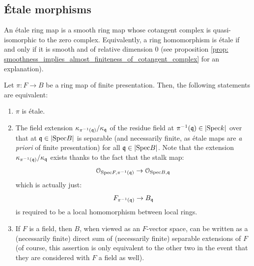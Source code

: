             \subsection{\'Etale morphisms} \label{subsection: etale_morphisms}
            \begin{definition} \label{def: etale_morphisms} 
                An \'etale ring map is a smooth ring map whose cotangent complex is quasi-isomorphic to the zero complex. Equivalently, a ring homomorphism is \'etale if and only if it is smooth and of relative dimension $0$ (see proposition \ref{prop: smoothness_implies_almost_finiteness_of_cotangent_complex} for an explanation). 
            \end{definition}
            
            \begin{proposition} \label{prop: separable_criterion_for_etaleness} 
                Let $\pi: F \to B$ be a ring map of finite presentation. Then, the following statements are equivalent:
                    \begin{enumerate}
                        \item $\pi$ is \'etale.
                        \item The field extension $\kappa_{\pi^{-1}(\mathfrak{q})}/\kappa_{\mathfrak{q}}$ of the residue field at $\pi^{-1}(\mathfrak{q}) \in |\mathrm{Spec} k|$ over that at $\mathfrak{q} \in |\mathrm{Spec} B|$ is separable (and necessarily finite, as \'etale maps are \textit{a priori} of finite presentation) for all $\mathfrak{q} \in |\mathrm{Spec} B|$. Note that the extension $\kappa_{\pi^{-1}(\mathfrak{q})}/\kappa_{\mathfrak{q}}$ exists thanks to the fact that the stalk map:
                            $$\mathcal{O}_{\mathrm{Spec} F, \pi^{-1}(\mathfrak{q})} \to \mathcal{O}_{\mathrm{Spec} B, \mathfrak{q}}$$
                        which is actually just: 
                            $$F_{\pi^{-1}(\mathfrak{q})} \to B_{\mathfrak{q}}$$
                        is required to be a local homomorphism between local rings.
                        \item If $F$ is a field, then $B$, when viewed as an $F$-vector space, can be written as a (necessarily finite) direct sum of (necessarily finite) separable extensions of $F$ (of course, this assertion is only equivalent to the other two in the event that they are considered with $F$ a field as well).
                    \end{enumerate}
            \end{proposition}

